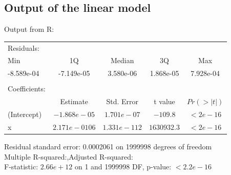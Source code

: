 \documentclass[a4paper, 10pt, envcountsect, runningheads]{lms}
\numberwithin{figure}{section}
\numberwithin{equation}{section}
\begin{document}
\subsection{Output of the linear model}\label{A:diagrams}
Output from R:
\begin{tabular}{lcccc}
Residuals:&&&&\\
Min & 1Q & Median & 3Q & Max\\ 
-8.589e-04 & -7.149e-05 & 3.580e-06 & 1.868e-05 & 7.928e-04 \\
&&&&\\
Coefficients:&&&&\\
					& Estimate & Std. Error & t value & $Pr(>|t|)$    \\
(Intercept) & $-1.868e-05$ &  $1.701e-07$  &  $-109.8$ & $< 2e-16$\\
x          &  $2.171e-0106$ & $1.331e-112$ & $1630932.3$ & $< 2e-16$\\
\end{tabular}
Residual standard error: 0.0002061 on 1999998 degrees of freedom\\
Multiple R-squared:,\quad Adjusted R-squared: \\
F-statistic: $2.66e+12$ on 1 and 1999998 DF,  p-value: $< 2.2e-16$
\end{document}
